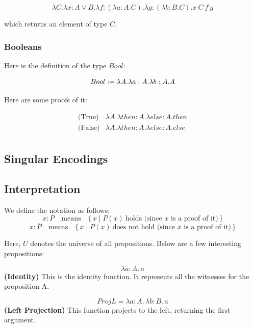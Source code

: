 \[
    \lambda C.\lambda x:A \lor B.\lambda f:(\lambda a:A.C).\lambda g:(\lambda b: B.C).x\ C\ f\ g
\]

\noindent which returns an element of type $C$.

\subsubsection{Booleans}

Here is the definition of the type $Bool$:

\[
    Bool := \lambda A.\lambda a:A.\lambda b:A.A \\
\]

\noindent Here are some proofs of it:

\[
\begin{array}{ll}
    \text{(True)} & \lambda A.\lambda then:A.\lambda else:A.then \\
    \text{(False)} & \lambda A.\lambda then:A.\lambda else:A.else \\
\end{array}
\]

\subsection{Singular Encodings}

\subsection{Interpretation}

We define the notation as follows:
\[
x : P\quad \text{means}\quad \{\,x \mid P(x)\ \text{holds (since \(x\) is a proof of it)}\,\}
\]
\[
x : \overline{P}\quad \text{means}\quad \{\,x \mid P(x)\ \text{does not hold (since \(x\) is a proof of it)}\,\}
\]

Here, \(U\) denotes the universe of all propositions.
Below are a few interesting propositions:

\begin{equation}
    \lambda a : A. \,a
\end{equation}
\textbf{(Identity)}  
This is the identity function. It represents all the witnesses for the proposition A.

\begin{equation}
    ProjL=\lambda a : A.\,\lambda b : B.\,a
\end{equation}
\textbf{(Left Projection)}  
This function projects to the left, returning the first argument.

